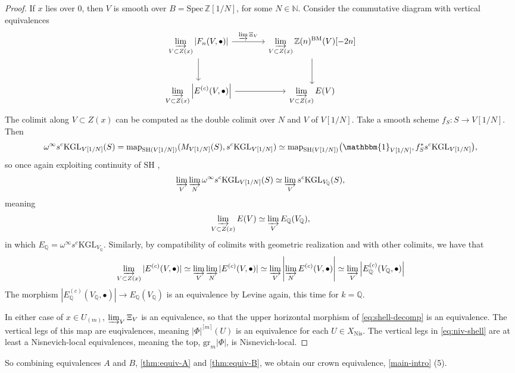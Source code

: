 \documentclass[11pt, twoside]{article}
\numberwithin{equation}{section}
\theoremstyle{definition}
\newcommand{\bb}[1]{\mathbb{#1}}
\newcommand{\colim}{\varinjlim}
\newcommand{\spec}{\mathrm{Spec} \,}
\newcommand{\map}{\mathrm{map}}
\newcommand{\gr}{\mathrm{gr}}
\newcommand{\Kgl}{\mathrm{KGL}}
\newcommand{\sh}{\mathrm{SH}}
\newcommand{\bm}{\mathrm{BM}}
\newcommand{\nis}{\mathrm{Nis}}
\begin{document}
\begin{proof}
If \(x\) lies over \(0\), then \(V\) is smooth over \(B = \spec \bb{Z}[1/N]\), for some \(N \in \bb{N}\). Consider the commutative diagram with vertical equivalences 
\[\begin{tikzcd} [row sep = large, column sep = large]
\displaystyle \colim_{V \subset Z(x)} \left \lvert F_n(V, \bullet) \right \rvert \ar[d] \ar[r, "\colim \Xi_V"] & \displaystyle \colim_{V \subset Z(x)} \bb{Z}(n)^\bm(V) \lbrack -2n \rbrack \ar[d]\\
\displaystyle \colim_{V \subset Z(x)} \left \lvert E^{(c)}(V, \bullet) \right \rvert \ar[r] & \displaystyle \colim_{V \subset Z(x)} E(V)
\end{tikzcd}\]
The colimit along \(V \subset Z(x)\) can be computed as the double colimit over \(N\) and \(V\) of \(V[1/N]\). Take a smooth scheme \(f_S \colon S \to V[1/N]\). Then 
\[\omega^\infty s^c \Kgl_{V[1/N]}(S) = \map_{\sh(V[1/N])}(M_{V[1/N]}(S), s^c \Kgl_{V[1/N]}) \simeq \map_{\sh(V[1/N])}\big(\mathbbm{1}_{V[1/N]}, f_S^* s^c \Kgl_{V[1/N]}\big),\]
so once again exploiting continuity of \(\sh\) \cite[1.3.9]{BonDeg}, 
\[\colim_V \colim_N \omega^\infty s^c \Kgl_{V[1/N]}(S) \simeq \colim_V s^c \Kgl_{V_\bb{Q}}(S),\]
meaning 
\[\colim_{V \subset Z(x)} E(V) \simeq \colim_V E_\bb{Q}(V_\bb{Q}),\]
in which \(E_\bb{Q} = \omega^\infty s^c \Kgl_{V_\bb{Q}}\). Similarly, by compatibility of colimits with geometric realization and with other colimits, we have that 
\[\colim_{V \subset Z(x)} |E^{(c)}(V, \bullet)| \simeq \colim_V \colim_N |E^{(c)}(V, \bullet)| \simeq \colim_V \left|\colim_N E^{(c)}(V, \bullet) \right| \simeq \colim_V \left|E_\bb{Q}^{(c)}(V_\bb{Q}, \bullet)\right|\]
The morphism \(|E_\bb{Q}^{(c)}(V_\bb{Q}, \bullet)| \to E_\bb{Q}(V_\bb{Q})\) is an equivalence by Levine \cite[Lemma 7.3.1]{LevHC} again, this time for \(k = \bb{Q}\).

In either case of \(x \in U_{(m)}\), \(\colim_V \Xi_V\) is an equivalence, so that the upper horizontal morphism of \ref{eq:shell-decomp} is an equivalence. The vertical legs of this map are euqivalences, meaning \(|\Phi|^{\lceil m \rceil}(U)\) is an equivalence for each \(U \in X_\nis\). The vertical legs in \eqref{eq:niv-shell} are at least a Nisnevich-local equivalences, meaning the top, \(\gr_m |\Phi|\), is Nisnevich-local.
\end{proof}

So combining equivalences \(A\) and \(B\), \ref{thm:equiv-A} and \ref{thm:equiv-B}, we obtain our crown equivalence, \ref{main-intro} (5).





\end{document}
